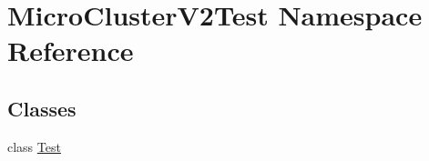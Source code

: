 \hypertarget{namespaceMicroClusterV2Test}{}\section{Micro\+Cluster\+V2\+Test Namespace Reference}
\label{namespaceMicroClusterV2Test}
\subsection*{Classes}
\begin{DoxyCompactItemize}
\item 
class \hyperlink{classMicroClusterV2Test_1_1Test}{Test}
\end{DoxyCompactItemize}
